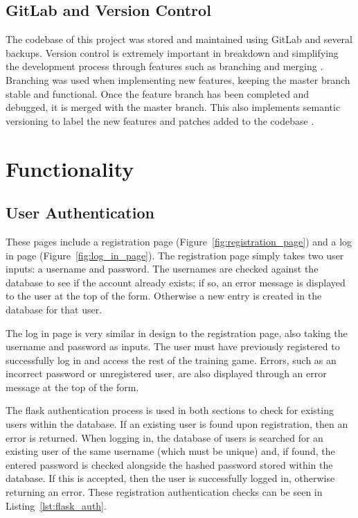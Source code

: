 \documentclass{l4proj}
\begin{document}
\subsection{GitLab and Version Control}
The codebase of this project was stored and maintained using GitLab and several backups. Version control is extremely important in breakdown and simplifying the development process through features such as branching and merging \citep{otte2009version}. Branching was used when implementing new features, keeping the master branch stable and functional. Once the feature branch has been completed and debugged, it is merged with the master branch. This also implements semantic versioning to label the new features and patches added to the codebase \citep{prestonwerner_2022}.

\section{Functionality}

\subsection{User Authentication}
These pages include a registration page (Figure~\ref{fig:registration_page}) and a log in page (Figure~\ref{fig:log_in_page}). The registration page simply takes two user inputs: a username and password. The usernames are checked against the database to see if the account already exists; if so, an error message is displayed to the user at the top of the form. Otherwise a new entry is created in the database for that user.

The log in page is very similar in design to the registration page, also taking the username and password as inputs. The user must have previously registered to successfully log in and access the rest of the training game. Errors, such as an incorrect password or unregistered user, are also displayed through an error message at the top of the form.

The flask authentication process is used in both sections to check for existing users within the database. If an existing user is found upon registration, then an error is returned. When logging in, the database of users is searched for an existing user of the same username (which must be unique) and, if found, the entered password is checked alongside the hashed password stored within the database. If this is accepted, then the user is successfully logged in, otherwise returning an error. These registration authentication checks can be seen in Listing~\ref{lst:flask_auth}.
\end{document}
